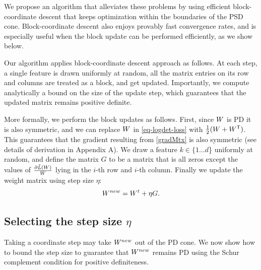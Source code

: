 \documentclass{article}
\begin{document}
We propose an algorithm that alleviates these problems by using efficient block-coordinate descent that keeps optimization within the boundaries of the PSD cone.
Block-coordinate descent also enjoys provably fast convergence rates, and is especially useful when the block update can be performed efficiently, as we show below.

Our algorithm applies block-coordinate descent approach as follows.
At each step, a single feature is drawn uniformly at random, all the matrix entries on its row and columns are treated as a block, and get updated. Importantly, we compute analytically a bound on the size of the update step, which guarantees that the updated matrix remains positive definite.

More formally, we perform the block updates as follows. First, since ${W}$ is PD it is also symmetric, and we can replace ${W}$ in \eqref{eq-logdet-loss} with $\tfrac{1}{2}({W} + {W}{}^\mathsf{T})$.  This guarantees that the gradient resulting from \eqref{gradMtx} is also symmetric (see details of derivation in Appendix A). We draw a feature $k \in \{1 \ldots d$\} uniformly at random, and define the matrix $G$ to be a matrix that is all zeros except the values of $\frac{\partial \tilde{L}({W})}{{W}}$ lying in the $i$-th row and $i$-th column. Finally we update the weight matrix using step size $\eta$:
\begin{equation}
    {{W^{new}}} = {W}^t +\eta G.
\label{updateEq}
\end{equation}


\subsection{Selecting the step size $\eta$}\label{subsec:step}
Taking a coordinate step may take ${{W^{new}}}$ out of the PD cone. We now show how to bound the step size to guarantee that ${{W^{new}}}$ remains PD using the Schur complement condition for positive definiteness.
\end{document}
